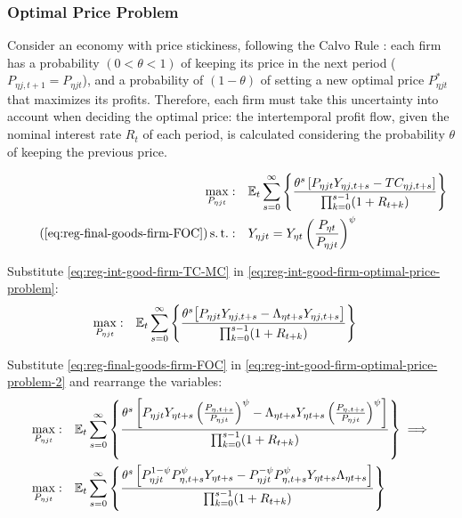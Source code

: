 \documentclass[
thesis.tex
]{subfiles}
\begin{document}

\subsubsection*{Optimal Price Problem}

Consider an economy with price stickiness, following the Calvo Rule \cite{calvo_staggered_1983}: each firm has a probability $(0 < \theta < 1)$ of keeping its price in the next period ($P_{\eta j,t+1} = P_{\eta jt}$), and a probability of $(1 - \theta)$ of setting a new optimal price $P_{\eta jt}^\ast$ that maximizes its profits. Therefore, each firm must take this uncertainty into account when deciding the optimal price: the intertemporal profit flow, given the nominal interest rate $R_{t}$ of each period, is calculated considering the probability $\theta$ of keeping the previous price.

\begin{align}
	\label{eq:reg-int-good-firm-optimal-price-problem}
	\max_{P_{\eta jt}}: & \quad \E \sum_{s=0}^{\infty} \left\{ \frac{ \theta^s \left[ P_{\eta jt} Y_{\eta j,t+s} - TC_{\eta j,t+s} \right] }{\prod_{k=0}^{s-1}(1+R_{t+k})} \right\} \\
	\tag{\ref{eq:reg-final-goods-firm-FOC}}
	\st: & \quad Y_{\eta jt} = Y_{\eta t} \left( \frac{P_{\eta t}}{P_{\eta jt}} \right)^{\psi}
\end{align}


Substitute \ref{eq:reg-int-good-firm-TC-MC} in \ref{eq:reg-int-good-firm-optimal-price-problem}:
\begin{align}
	\label{eq:reg-int-good-firm-optimal-price-problem-2}
	\max_{P_{\eta jt}}: & \quad {\mathbb{E}_{t}} \sum_{s=0}^{\infty} \left\{ \frac{\theta^s \big[ P_{\eta jt} Y_{\eta j,t+s} - \Lambda_{\eta t+s} Y_{\eta j,t+s} \big]}{\prod_{k=0}^{s-1}(1+R_{t+k})} \right\}
\end{align}

Substitute \ref{eq:reg-final-goods-firm-FOC} in \ref{eq:reg-int-good-firm-optimal-price-problem-2} and rearrange the variables:
\begin{align}
	\max_{P_{\eta jt}}: & \quad {\mathbb{E}_{t}} \sum_{s=0}^{\infty} \left\{ \frac{\theta^s \left[ P_{\eta jt} Y_{\eta t+s} \left( \frac{P_{\eta, t+s}}{P_{\eta jt}} \right)^{\psi} - \Lambda_{\eta t+s} Y_{\eta t+s} \left( \frac{P_{\eta, t+s}}{P_{\eta jt}} \right)^{\psi} \right] }{\prod_{k=0}^{s-1}(1+R_{t+k})} \right\} \implies \nonumber 
	\\
	\max_{P_{\eta jt}}: & \quad {\mathbb{E}_{t}} \sum_{s=0}^{\infty} \left\{ \frac{\theta^s \left[ P_{\eta jt}^{1-\psi} P_{\eta, t+s}^{\psi} Y_{\eta t+s} - P_{\eta jt}^{-\psi} P_{\eta, t+s}^{\psi} Y_{\eta t+s} \Lambda_{\eta t+s} \right] }{\prod_{k=0}^{s-1}(1+R_{t+k})} \right\} \nonumber
\end{align}
\end{document}
